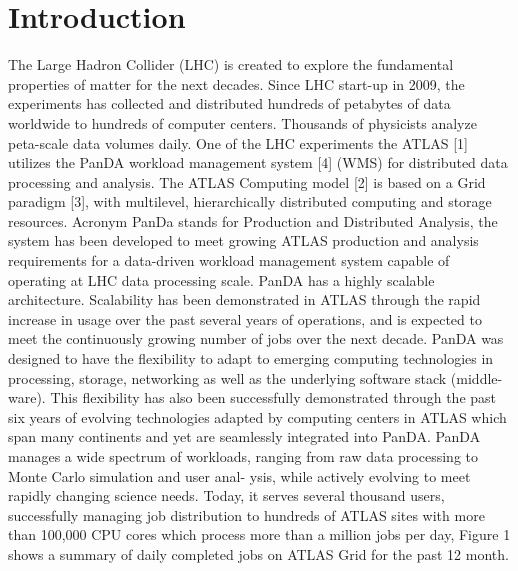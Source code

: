\documentclass[10pt, conference, compsocconf]{IEEEtran}
\begin{document}
\section{Introduction}\label{sec:intro}
The Large Hadron Collider (LHC) is created  to explore the fundamental  properties  of matter for the next decades. Since LHC start-up in 2009, the experiments has collected and distributed hundreds  of  petabytes  of  data worldwide to hundreds of computer centers. Thousands of physicists analyze peta-scale  data volumes daily. One of  the LHC experiments  the ATLAS  [1]  utilizes the PanDA  workload management system [4] (WMS) for distributed data processing and analysis. The ATLAS Computing model [2] is based on a Grid paradigm [3], with multilevel, hierarchically distributed computing  and storage resources. Acronym  PanDa stands for Production  and Distributed Analysis, the system  has  been developed to meet growing ATLAS production and analysis requirements for a data-driven  workload  management system capable of operating at LHC data processing scale.
PanDA has a highly scalable architecture. Scalability  has been demonstrated in ATLAS through the rapid increase in usage over the past several years of operations, and is expected to meet the continuously growing number of jobs over the next decade. PanDA  was designed to have the flexibility to adapt to emerging computing  technologies in processing,  storage, networking  as well as the underlying software stack (middle- ware). This flexibility has also been successfully demonstrated through the past six years of evolving  technologies adapted by computing centers in ATLAS which span many continents and yet are seamlessly integrated into PanDA.
PanDA  manages a wide spectrum of workloads, ranging from raw data processing to Monte Carlo simulation and user anal- ysis, while actively evolving to meet rapidly changing science needs.  Today, it  serves several  thousand users, successfully managing job distribution to hundreds of ATLAS sites with more than 100,000 CPU cores  which process  more than a million jobs per day, Figure 1 shows  a  summary   of daily completed jobs on ATLAS Grid for the past 12 month.
\end{document}
